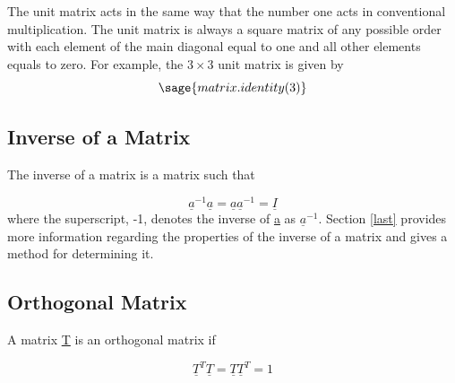 \documentclass[12pt]{report}
\begin{document}
The unit matrix acts in the same way that the number one acts in
conventional multiplication. The unit matrix is always a square matrix
of any possible order with each element of the main diagonal equal to
one and all other elements equals to zero. For example, the $3 \times 3$
unit matrix is given by
\begin{equation}
	\sage{matrix.identity(3)}
\end{equation}


\subsection{Inverse of a Matrix}

The inverse of a matrix is a matrix such that

\begin{equation}
	\underline{a}^{-1}\underline{a}=\underline{a}\underline{a}^{-1}=\underline{I}
\end{equation}
where the superscript, -1, denotes the inverse of \underline{a} 
as $\underline{a}^{-1}$. Section \ref{last} provides more 
information regarding the properties of the inverse of a 
matrix and gives a method for determining it.


\subsection{Orthogonal Matrix}

A matrix \underline{T} is an orthogonal matrix if

\begin{equation}
	\underline{T}^T\underline{T} = \underline{T}\underline{T}^T=1
\end{equation}
\end{document}
